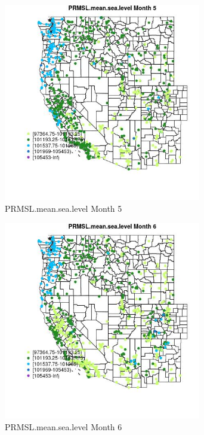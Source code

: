 \begin{figure} 
\centering  
\includegraphics[width=0.77\textwidth]{Code_Outputs/Report_ML_input_PM25_Step4_part_f_de_duplicated_aveswNAs_MapObsMo5PRMSLmeansealevel.jpg} 
\caption{\label{fig:Report_ML_input_PM25_Step4_part_f_de_duplicated_aveswNAsMapObsMo5PRMSLmeansealevel}PRMSL.mean.sea.level Month 5} 
\end{figure} 
 

\begin{figure} 
\centering  
\includegraphics[width=0.77\textwidth]{Code_Outputs/Report_ML_input_PM25_Step4_part_f_de_duplicated_aveswNAs_MapObsMo6PRMSLmeansealevel.jpg} 
\caption{\label{fig:Report_ML_input_PM25_Step4_part_f_de_duplicated_aveswNAsMapObsMo6PRMSLmeansealevel}PRMSL.mean.sea.level Month 6} 
\end{figure} 
 

